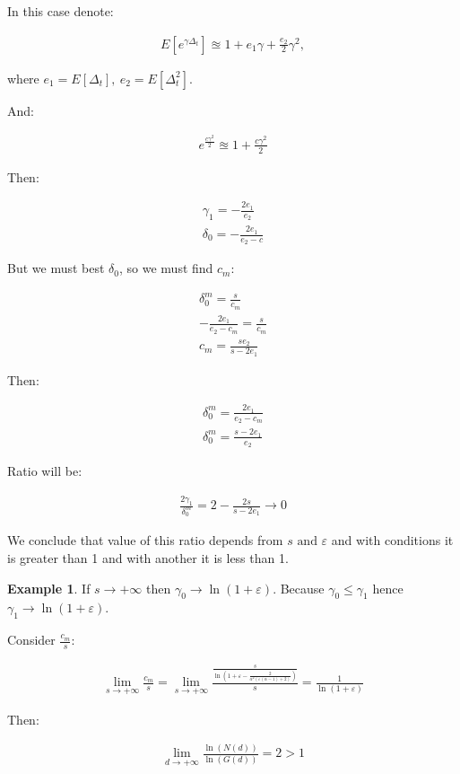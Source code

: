 \documentclass[12pt, a4paper]{article}
\theoremstyle{remark}
\theoremstyle{definition}
\newtheorem*{exmp}{Example}
\newcommand{\limd}{\lim\limits_{d \to +\infty}}
\begin{document}
In this case denote: 

\begin{align*}
    E[e^{\gamma \Delta_t}] \approxeq 1 + e_1 \gamma + \frac{e_2}{2} \gamma^2,
\end{align*}

where \(e_1 = E[\Delta_t],\ e_2 = E[\Delta_t^2]\).

And:

\begin{align*}
    e^{\frac{c \gamma^2}{2}} \approxeq 1 + \frac{c \gamma^2}{2}
\end{align*}

Then:

\begin{gather*}
    \gamma_1 = -\frac{2e_1}{e_2} \\
    \delta_0 = -\frac{2e_1}{e_2 - c}
\end{gather*}

But we must best \(\delta_0\), so we must find \(c_m\):

\begin{gather*}
    \delta_0^m = \frac{s}{c_m} \\
    -\frac{2e_1}{e_2 -c_m} = \frac{s}{c_m} \\
    c_m = \frac{s e_2}{s - 2e_1}
\end{gather*}

Then:

\begin{gather*} 
    \delta_0^m = \frac{2e_1}{e_2 - c_m} \\
    \delta_0^m = \frac{s - 2e_1}{e_2}
\end{gather*}

Ratio will be: 

\begin{gather*}
    \frac{2 \gamma_1}{\delta_0^m} = 2 - \frac{2 s}{s - 2 e_1} \to 0
\end{gather*}

We conclude that value of this ratio depends from \(s \text{ and } \varepsilon\) and with conditions it is greater than 1 and with another it is less than 1.

\begin{exmp}
    If \(s \to +\infty\) then \(\gamma_0 \to \ln(1 + \varepsilon)\). Because \(\gamma_0 \leq \gamma_1\) hence \(\gamma_1 \to \ln(1 + \varepsilon)\). 
    
    Consider \(\frac{c_m}{s}\):

    \begin{align*}
        \lim\limits_{s \to +\infty} \frac{c_m}{s} = \lim\limits_{s \to +\infty} \frac{\frac{s}{\ln\left(1 + \varepsilon - \frac{2}{\alpha^2(\varepsilon(\alpha - 1) + 2)}\right)}}{s} = \frac{1}{\ln(1 + \varepsilon)}
    \end{align*}

    Then:

    \begin{align*}
        \limd \frac{\ln(N(d))}{\ln(G(d))} = 2 > 1
    \end{align*}
\end{exmp}
\end{document}
